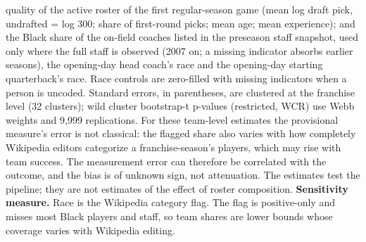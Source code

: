 \begin{table}[!h]
{\begin{threeparttable}
\begin{tablenotes}[para]
quality of the active roster of the first regular-season game (mean log draft pick, undrafted = log 300; share of first-round picks; mean age; mean experience); and the Black share of the on-field coaches listed in the preseason staff snapshot, used only where the full staff is observed (2007 on; a missing indicator absorbs earlier seasons), the opening-day head coach's race and the opening-day starting quarterback's race. Race controls are zero-filled with missing indicators when a person is uncoded. Standard errors, in parentheses, are clustered at the franchise level (32 clusters); wild cluster bootstrap-t p-values (restricted, WCR) use Webb weights and 9,999 replications. For these team-level estimates the provisional measure's error is not classical: the flagged share also varies with how completely Wikipedia editors categorize a franchise-season's players, which may rise with team success. The measurement error can therefore be correlated with the outcome, and the bias is of unknown sign, not attenuation. The estimates test the pipeline; they are not estimates of the effect of roster composition. \textbf{Sensitivity measure.} Race is the Wikipedia category flag. The flag is positive-only and misses most Black players and staff, so team shares are lower bounds whose coverage varies with Wikipedia editing.
\end{tablenotes}
\end{threeparttable}}
\end{table}
